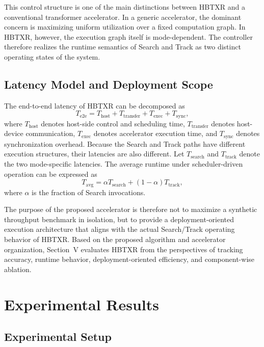 ﻿\documentclass[journal]{IEEEtran}
\begin{document}
This control structure is one of the main distinctions between HBTXR and a conventional transformer accelerator. In a generic accelerator, the dominant concern is maximizing uniform utilization over a fixed computation graph. In HBTXR, however, the execution graph itself is mode-dependent. The controller therefore realizes the runtime semantics of Search and Track as two distinct operating states of the system.

\subsection{Latency Model and Deployment Scope}

The end-to-end latency of HBTXR can be decomposed as
\begin{equation}
T_{\mathrm{e2e}}
=
T_{\mathrm{host}}
+
T_{\mathrm{transfer}}
+
T_{\mathrm{exec}}
+
T_{\mathrm{sync}},
\label{eq:latency_decomp}
\end{equation}
where \(T_{\mathrm{host}}\) denotes host-side control and scheduling time, \(T_{\mathrm{transfer}}\) denotes host-device communication, \(T_{\mathrm{exec}}\) denotes accelerator execution time, and \(T_{\mathrm{sync}}\) denotes synchronization overhead. Because the Search and Track paths have different execution structures, their latencies are also different. Let \(T_{\mathrm{search}}\) and \(T_{\mathrm{track}}\) denote the two mode-specific latencies. The average runtime under scheduler-driven operation can be expressed as
\begin{equation}
T_{\mathrm{avg}}
=
\alpha T_{\mathrm{search}}
+
(1-\alpha)T_{\mathrm{track}},
\label{eq:avg_latency}
\end{equation}
where \(\alpha\) is the fraction of Search invocations.

The purpose of the proposed accelerator is therefore not to maximize a synthetic throughput benchmark in isolation, but to provide a deployment-oriented execution architecture that aligns with the actual Search/Track operating behavior of HBTXR. Based on the proposed algorithm and accelerator organization, Section~V evaluates HBTXR from the perspectives of tracking accuracy, runtime behavior, deployment-oriented efficiency, and component-wise ablation.

\section{Experimental Results}

\subsection{Experimental Setup}
\end{document}
